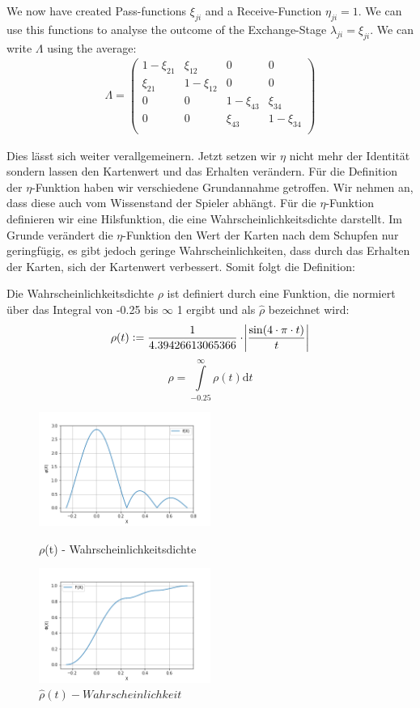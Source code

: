 We now have created Pass-functions $\xi_{ji}$ and a Receive-Function $\eta_{ji} = 1$. We can use this functions to analyse the outcome of the Exchange-Stage $\lambda_{ji} = \xi_{ji}$. We can write $\Lambda$ using the average:
\begin{gather*}
\Lambda = \begin{pmatrix} 
1 - \xi_{21} & \xi_{12} & 0 & 0 \\
\xi_{21} & 1 - \xi_{12} & 0 & 0 \\
0 & 0 & 1 -  \xi_{43} & \xi_{34} \\
0 & 0 &  \xi_{43} & 1 - \xi_{34} \\
\end{pmatrix}
\end{gather*}

Dies lässt sich weiter verallgemeinern. Jetzt setzen wir $\eta$ nicht mehr der Identität sondern lassen den Kartenwert und das Erhalten verändern. Für die Definition der $\eta$-Funktion haben wir verschiedene Grundannahme getroffen. Wir nehmen an, dass diese auch vom Wissenstand der Spieler abhängt. Für die $\eta$-Funktion definieren wir eine Hilsfunktion, die eine Wahrscheinlichkeitsdichte darstellt. Im Grunde verändert die $\eta$-Funktion den Wert der Karten nach dem Schupfen nur geringfügig, es gibt jedoch geringe Wahrscheinlichkeiten, dass durch das Erhalten der Karten, sich der Kartenwert verbessert. Somit folgt die Definition:
\begin{definition}[Wahrscheinlichkeitsdichte]
Die Wahrscheinlichkeitsdichte $\rho$ ist definiert durch eine Funktion, die normiert über das Integral von -0.25 bis $\infty$ 1 ergibt und als $\hat{\rho}$ bezeichnet wird:
$$
\rho (t) := \frac{1}{4.39426613065366}\cdot\abs{\frac{\sin(4\cdot\pi\cdot t)}{t}}
$$
$$
\widehat{\rho} = \int\limits_{-0.25}^{\infty}\rho (t)\mathrm{d} t
$$
\end{definition}
\begin{figure}[h]
    \centering
    \includegraphics[width=0.5\textwidth]{Bilder/b1_e}
    \caption{$\rho$(t) - Wahrscheinlichkeitsdichte}
    \label{fig:meine-grafik}
    \centering
    \includegraphics[width=0.5\textwidth]{Bilder/b1_f}
    \caption{$\widehat{\rho}(t) - Wahrscheinlichkeit$}
    \label{fig:meine-grafik}
\end{figure}
